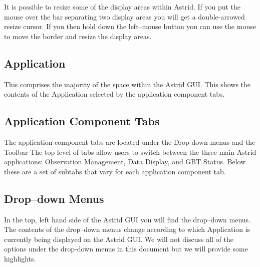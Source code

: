 It is possible to resize some of the display areas within \gls{Astrid}.  If 
you put the mouse over the bar separating two display areas you will
get a double-arrowed resize cursor.  If you then hold down the
left--mouse button you can use the mouse to move the border and resize
the display areas.

\subsection{Application}

This comprises the majority of the space within the \gls{Astrid} \gls{GUI}.  This 
shows the contents of the Application selected by the application component tabs.

\subsection{Application Component Tabs}

The application component tabs are located under the Drop-down menus and the Toolbar
The top level of tabs allow users to switch between the three main \gls{Astrid}
applications: Observation Management, Data Display, and GBT Status.  Below these
are a set of subtabs that vary for each application component tab.

\newpage

\subsection{Drop--down Menus}\label{sec:dropdownmenus}

In the top, left hand side of the \gls{Astrid} \gls{GUI} you will find the drop--down
menus.  The contents of the drop--down menus change according to which
Application is currently being displayed on the \gls{Astrid} \gls{GUI}.  We will
not discuss all of the options under the drop-down menus in this document
but we will provide some highlights.


